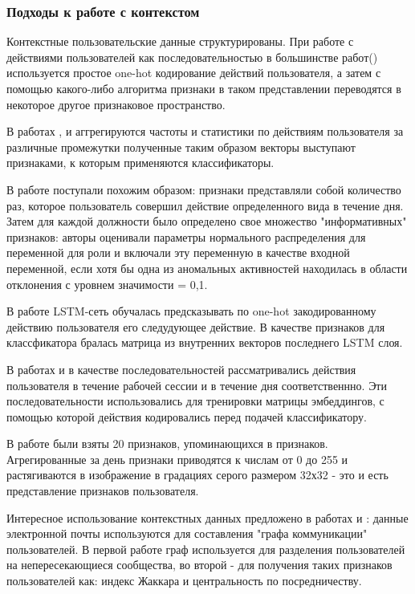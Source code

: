 \subsubsection{Подходы к работе с контекстом}

Контекстные пользовательские данные структурированы.
При работе с действиями пользователей как последовательностью в большинстве работ(\cite{gru}) используется простое one-hot кодирование действий пользователя, а затем с помощью какого-либо алгоритма признаки в таком представлении переводятся в некоторое другое признаковое пространство.

В работах \cite{granual}, \cite{suites} и \cite{ocsvm} аггрегируются частоты и статистики по действиям пользователя за различные промежутки полученные таким образом векторы выступают признаками, к которым применяются классификаторы.

В работе \cite{anomalyalgo} поступали похожим образом: признаки представляли собой количество раз, которое пользователь совершил действие определенного вида в течение дня. Затем для каждой должности было определено свое множество "информативных" признаков: авторы оценивали параметры нормального распределения для переменной для роли и включали эту переменную в качестве входной переменной, если хотя бы одна из аномальных активностей находилась в области отклонения с уровнем значимости = 0,1.

В работе \cite{lstm_cnn} LSTM-сеть обучалась предсказывать по one-hot закодированному действию пользователя его следудующее действие. В качестве признаков для классфикатора бралась матрица из внутренних векторов последнего LSTM слоя.

В работах \cite{cnn_lstm} и \cite{attention} в качестве последовательностей рассматривались действия пользователя в течение рабочей сессии и в течение дня соответственнно. Эти последовательности использовались для тренировки матрицы эмбеддингов, с помощью которой действия кодировались перед подачей классификатору.

В работе \cite{imagebased} были взяты 20 признаков, упоминающихся в \cite{scenario} признаков. Агрегированные за день признаки приводятся к числам от 0 до 255 и растягиваются в изображение в градациях серого размером 32х32 - это и есть представление признаков пользователя.

Интересное использование контекстных данных предложено в работах \cite{lac} и \cite{anomalyalgo}: данные электронной почты используются для составления "графа коммуникации" пользователей. В первой работе граф используется для разделения пользователей на непересекающиеся сообщества, во второй - для получения таких признаков пользователей как: индекс Жаккара и центральность по посредничеству.

